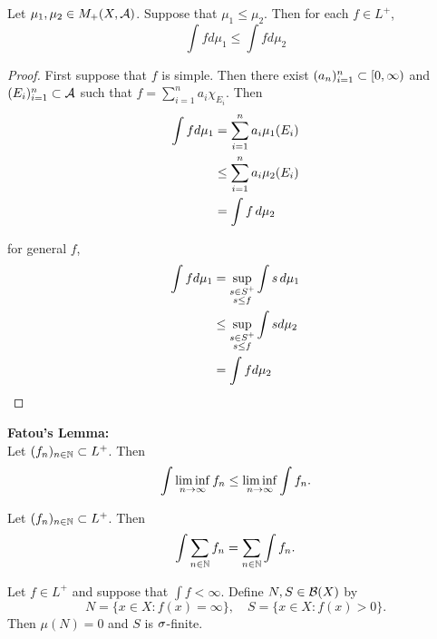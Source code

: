 \documentclass{book}
\begin{document}
	\begin{ex} 
		Let $\mu_1, \mu_2 \in M_+(X,\mathcal{A})$. Suppose that $\mu_1 \leq \mu_2$. Then for each $f \in L^+$, $$\int f d\mu_1 \leq \int f d\mu_2$$
	\end{ex}
	
	\begin{proof}
		First suppose that $f$ is simple. Then there exist $(a_n)_{i=1}^n \subset [0,\infty)$ and $(E_i)_{i=1}^n \subset \mathcal{A}$ such that $f = \sum\limits_{i =1}^n a_i \chi_{E_i}$. Then 
		\begin{align*}
			\int f d\mu_1 
			&= \sum\limits_{i =1}^n a_i \mu_1(E_i)\\
			& \leq \sum\limits_{i =1}^n a_i \mu_2(E_i)\\
			&= \int f \, d \mu_2
		\end{align*} 
		
		for general $f$, 
		\begin{align*}
			\int f d\mu_1 
			&= \sup_{\substack{s \in S^+\\s \leq f}} \int s \, d \mu_1 \\
			& \leq \sup_{\substack{s \in S^+\\s \leq f}} \int s d\mu_2\\
			&= \int f d\mu_2
		\end{align*}
		
	\end{proof}
	
	\begin{thm}  \textbf{Fatou's Lemma:}\\
		Let $(f_n)_{n \in \mathbb{N}} \subset L^+$. Then 
		$$\int \liminf \limits_{n \rightarrow \infty} f_n \leq \liminf \limits_{n \rightarrow \infty} \int f_n.$$
	\end{thm}
	
	\begin{thm} 
		Let $(f_n)_{n \in \mathbb{N}} \subset L^+$. Then 
		$$\int \sum_{n \in \mathbb{N}} f_n= \sum_{n \in \mathbb{N}} \int f_n.$$
	\end{thm}
	
	\begin{ex} 
		Let $f \in L^+$ and suppose that $\int f < \infty$. Define $N, S \in \mathcal{B}(X)$ by 
		$$N = \{x \in X: f(x) = \infty\}, \quad S = \{x \in X: f(x) > 0\}.$$ 
		Then $\mu(N) = 0$ and $S$ is $\sigma$-finite.
	\end{ex}
	
\end{document}
